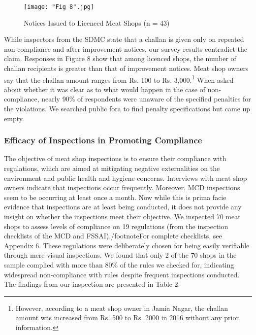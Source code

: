 \documentclass[a4paper, 12pt]{article}
\begin{document}
\begin{figure}[H]
\centering
\texttt{[image: "Fig 8".jpg]}
\caption[Optional Caption]{Notices Issued to Licenced Meat Shops (n = 43)\footnotemark }
\end{figure}

While inspectors from the SDMC state that a challan is given only on repeated non-compliance and after improvement notices, our survey results contradict the claim. Responses in Figure 8 show that among licenced shops, the number of challan recipients is greater than that of improvement notices. Meat shop owners say that the challan amount ranges from Rs. 100 to Rs. 3,000.\footnote{However, according to a meat shop owner in Jamia Nagar, the challan amount was increased from Rs. 500 to Rs. 2000 in 2016 without any prior information.} When asked about whether it was clear as to what would happen in the case of non-compliance, nearly 90\% of respondents were unaware of the specified penalties for the violations. We searched public fora to find penalty specifications but came up empty.

\subsubsection{Efficacy of Inspections in Promoting Compliance}

The objective of meat shop inspections is to ensure their compliance with regulations, which are aimed at mitigating negative externalities on the environment and public health and hygiene concerns. Interviews with meat shop owners indicate that inspections occur frequently. Moreover, MCD inspections seem to be occurring at least once a month. Now while this is prima facie evidence that inspections are at least being conducted, it does not provide any insight on whether the inspections meet their objective. We inspected 70 meat shops to assess levels of compliance on 19 regulations (from the inspection checklists of the MCD and FSSAI)./footnote{For complete checklists, see Appendix 6.} These regulations were deliberately chosen for being easily verifiable through mere visual inspections. We found that only 2 of the 70 shops in the sample complied with more than 80\% of the rules we checked for, indicating widespread non-compliance with rules despite frequent inspections conducted. \\

The findings from our inspection are presented in Table 2. \\
\end{document}
